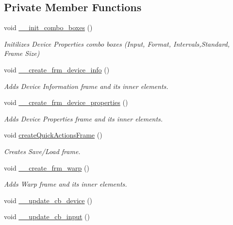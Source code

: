 \subsection*{Private Member Functions}
\begin{DoxyCompactItemize}
\item 
void \hyperlink{class_v_s_s_s___g_u_i_1_1_v4_l_interface_ab0ec02e9be4c0642bd05cb227ec7c8b8}{\+\_\+\+\_\+init\+\_\+combo\+\_\+boxes} ()
\begin{DoxyCompactList}\small\item\em Initilizes Device Properties combo boxes (Input, Format, Intervals,Standard, Frame Size) \end{DoxyCompactList}\item 
void \hyperlink{class_v_s_s_s___g_u_i_1_1_v4_l_interface_a91c4e5aea234b253ed674e0ae5bfdd33}{\+\_\+\+\_\+create\+\_\+frm\+\_\+device\+\_\+info} ()
\begin{DoxyCompactList}\small\item\em Adds Device Information frame and its inner elements. \end{DoxyCompactList}\item 
void \hyperlink{class_v_s_s_s___g_u_i_1_1_v4_l_interface_ae878d432706af05ddc9afe849739327e}{\+\_\+\+\_\+create\+\_\+frm\+\_\+device\+\_\+properties} ()
\begin{DoxyCompactList}\small\item\em Adds Device Properties frame and its inner elements. \end{DoxyCompactList}\item 
void \hyperlink{class_v_s_s_s___g_u_i_1_1_v4_l_interface_a9e3f937e1515c7b5488520caf924b857}{create\+Quick\+Actions\+Frame} ()
\begin{DoxyCompactList}\small\item\em Creates Save/\+Load frame. \end{DoxyCompactList}\item 
void \hyperlink{class_v_s_s_s___g_u_i_1_1_v4_l_interface_a3a93979f5fe811ca90616e568a6df989}{\+\_\+\+\_\+create\+\_\+frm\+\_\+warp} ()
\begin{DoxyCompactList}\small\item\em Adds Warp frame and its inner elements. \end{DoxyCompactList}\item 
void \hyperlink{class_v_s_s_s___g_u_i_1_1_v4_l_interface_a330fb43d7ec637c5e3a78ae4344a5865}{\+\_\+\+\_\+update\+\_\+cb\+\_\+device} ()
\item 
void \hyperlink{class_v_s_s_s___g_u_i_1_1_v4_l_interface_a33ec32eed4c06634040616c52b588e01}{\+\_\+\+\_\+update\+\_\+cb\+\_\+input} ()

\end{DoxyCompactItemize}
